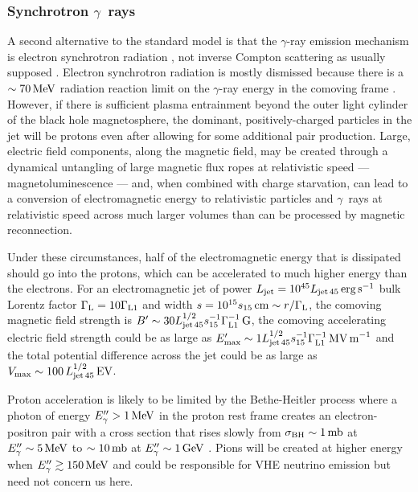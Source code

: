 \documentclass[twocolumn,linenumbers]{aastex62}
\newcommand{\Grays}{$\gamma$~rays\xspace}
\newcommand{\gray}{$\gamma$-ray\xspace}
\begin{document}
\subsubsection{Synchrotron \Grays}
\label{sec:gammasync}

A second alternative to the standard model is that the \gray emission mechanism is electron synchrotron radiation \citep{TheFermi-LAT:2016dss}, not inverse Compton scattering as usually supposed \citep[e.g.,][]{Madejski:2016oqg}.
Electron synchrotron radiation is mostly dismissed because there is a $\sim70\,{\rm MeV}$ radiation reaction limit on the \gray energy in the comoving frame \citep[e.g.,][]{1975ctf..book.....L,blandford:2017mag}. However, if there is sufficient plasma entrainment beyond the outer light cylinder of the black hole magnetosphere, the dominant, positively-charged particles in the jet will be protons even after allowing for some additional pair production. Large, electric field components, along the magnetic field, may be created through a dynamical untangling of large magnetic flux ropes at relativistic speed --- magnetoluminescence --- and, when combined with charge starvation, can lead to a conversion of electromagnetic energy to relativistic particles and \Grays at relativistic speed across much larger volumes than can be processed by magnetic reconnection. 

Under these circumstances, half of the electromagnetic energy that is dissipated should go into the protons, which can be accelerated to much higher energy than the electrons. For an electromagnetic jet of power $L_{\rm jet}=10^{45}L_{\rm jet\,45}\,{\rm erg\,s}^{-1}$ bulk Lorentz factor $\Gamma_{\rm L}=10\Gamma_{\rm L1}$ and width $s=10^{15}s_{15}\,{\rm cm}\sim r/\Gamma_{\rm L}$, the comoving magnetic field strength is $B'\sim30L_{\rm jet\,45}^{1/2}s_{15}^{-1}\Gamma_{\rm L1}^{-1}\,{\rm G}$, the comoving accelerating electric field strength could be as large as $E'_{\rm max}\sim1L_{\rm jet\,45}^{1/2}s_{15}^{-1}\Gamma_{\rm L1}^{-1}\,{\rm MV\,m}^{-1}$ and the total potential difference across the jet could be as large as $V_{\rm max}\sim100\,L_{\rm jet\,45}^{1/2}\,{\rm EV}$. 

Proton acceleration is likely to be limited by the Bethe-Heitler process where a photon of energy $E''_\gamma>1\,{\rm MeV}$ in the proton rest frame creates an electron-positron pair with a cross section that rises slowly from $\sigma_{\rm BH}\sim1\,{\rm mb}$ at $E_\gamma''\sim5\,{\rm MeV}$ to $\sim 10\,{\rm mb}$ at $E_\gamma''\sim1\,{\rm GeV}$ \citep[e.g.,][]{2009herb.book.....D}. Pions will be created at higher energy when $E''_{\gamma}\gtrsim150\,{\rm MeV}$ and could be responsible for VHE neutrino emission but need not concern us here. 
\end{document}
